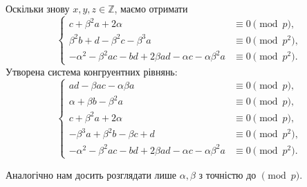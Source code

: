 \documentclass{thesis}
\begin{document}
Оскільки знову $x,y,z \in \mathbb{Z}$, маємо отримати
\begin{equation*}
\begin{cases}
c +\beta^2 a + 2\alpha & \equiv 0 \pmod p, \\
\beta^2 b + d - \beta^2 c - \beta^3 a & \equiv 0 \pmod {p^2}, \\
-\alpha^2 - \beta^2 ac - bd + 2 \beta a d - \alpha c - \alpha \beta^2 a & \equiv 0 \pmod {p^2}.
\end{cases}
\end{equation*}
Утворена система конгруентних рівнянь:
\begin{equation}
\label{system_of_equation_where_theta_cubed_not_in_tilde_lambda}
\begin{cases}
ad - \beta ac - \alpha \beta a & \equiv 0 \pmod p, \\
\alpha + \beta b - \beta^2 a & \equiv 0 \pmod p, \\
c +\beta^2 a + 2\alpha & \equiv 0 \pmod p, \\
- \beta^3 a + \beta^2 b - \beta c + d & \equiv 0 \pmod {p^2}, \\
-\alpha^2 - \beta^2 ac - bd + 2 \beta a d - \alpha c - \alpha \beta^2 a & \equiv 0 \pmod {p^2}.
\end{cases}
\end{equation}

\begin{remark}
Аналогічно нам досить розглядати лише $\alpha,\beta$ з точністю до $\pmod p$.
\end{remark}
\end{document}
